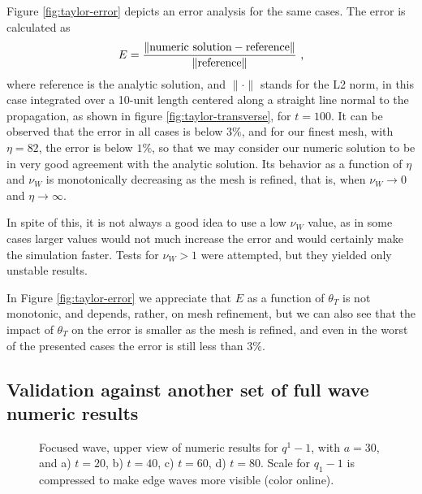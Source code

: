 Figure \ref{fig:taylor-error} depicts an error analysis for the
same cases. The error is calculated as \citep{jing2011evaluation}
\begin{align}
  \label{eq:error}
  E = \frac{\| \text{numeric solution}- \text{reference}\|}
    {\|\text{reference}\|} \ \text{,}
\end{align}
where reference is the analytic solution, and $\|\cdot\|$ stands for the L2 norm, in this case integrated over a 10-unit length centered along a straight line normal to the propagation, as shown in figure \ref{fig:taylor-transverse}, for $t=100$. 
It can be observed that the error in all cases is below $3\%$, and for our finest mesh, with $\eta=82$, the error is below $1\%$, so that we may consider our numeric solution to be in very good agreement with the analytic solution.
Its behavior as a function of $\eta$ and $\nu_W$ is monotonically decreasing as the mesh is refined, that is, when $\nu_W \rightarrow 0$ and $\eta \rightarrow \infty$.

In spite of this, it is not always a good idea to use a low $\nu_W$ value, as in some cases larger values would not much increase the error and would certainly make the simulation faster.  Tests for $\nu_W>1$ were attempted, but they yielded only unstable results.

In Figure \ref{fig:taylor-error} we appreciate that $E$ as a function of $\theta_T$ is not monotonic, and depends, rather, on mesh refinement, but we can also see that the impact of $\theta_T$ on the error is smaller as the mesh is refined, and even in the worst of the presented cases the error is still less than $3\%$.

\subsection{Validation against another set of full wave numeric results}
\label{sec:agains-anoth-numer}

\begin{figure*}[htb] 
\centering 
{} 
\caption{Focused wave, upper view of numeric results for $q^1-1$,  with $a=30$, and a) $t=20$, b) $t=40$, c) $t=60$, d)  $t=80$. Scale for $q_1-1$ is compressed to make edge waves more visible (color online).}
\label{fig:hifu-upper}
\end{figure*}

